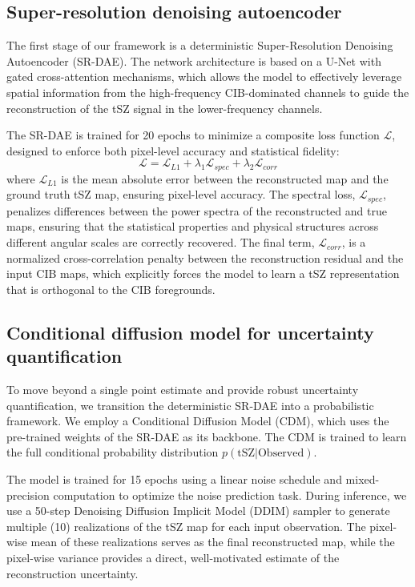 \documentclass[]{article}
\begin{document}
\subsection{Super-resolution denoising autoencoder}
The first stage of our framework is a deterministic Super-Resolution Denoising Autoencoder (SR-DAE). The network architecture is based on a U-Net with gated cross-attention mechanisms, which allows the model to effectively leverage spatial information from the high-frequency CIB-dominated channels to guide the reconstruction of the tSZ signal in the lower-frequency channels.

The SR-DAE is trained for 20 epochs to minimize a composite loss function $\mathcal{L}$, designed to enforce both pixel-level accuracy and statistical fidelity:
\begin{equation}
    \mathcal{L} = \mathcal{L}_{L1} + \lambda_1 \mathcal{L}_{spec} + \lambda_2 \mathcal{L}_{corr}
\end{equation}
where $\mathcal{L}_{L1}$ is the mean absolute error between the reconstructed map and the ground truth tSZ map, ensuring pixel-level accuracy. The spectral loss, $\mathcal{L}_{spec}$, penalizes differences between the power spectra of the reconstructed and true maps, ensuring that the statistical properties and physical structures across different angular scales are correctly recovered. The final term, $\mathcal{L}_{corr}$, is a normalized cross-correlation penalty between the reconstruction residual and the input CIB maps, which explicitly forces the model to learn a tSZ representation that is orthogonal to the CIB foregrounds.

\subsection{Conditional diffusion model for uncertainty quantification}
To move beyond a single point estimate and provide robust uncertainty quantification, we transition the deterministic SR-DAE into a probabilistic framework. We employ a Conditional Diffusion Model (CDM), which uses the pre-trained weights of the SR-DAE as its backbone. The CDM is trained to learn the full conditional probability distribution $p(\text{tSZ} | \text{Observed})$.

The model is trained for 15 epochs using a linear noise schedule and mixed-precision computation to optimize the noise prediction task. During inference, we use a 50-step Denoising Diffusion Implicit Model (DDIM) sampler to generate multiple (10) realizations of the tSZ map for each input observation. The pixel-wise mean of these realizations serves as the final reconstructed map, while the pixel-wise variance provides a direct, well-motivated estimate of the reconstruction uncertainty.
\end{document}
